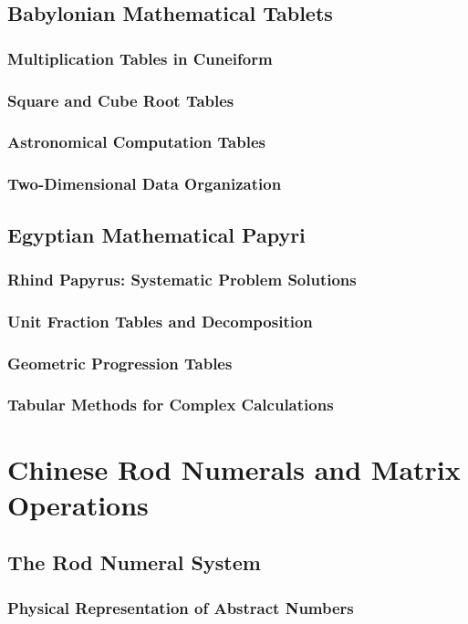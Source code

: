 \documentclass[12pt, oneside, openany]{book}
\begin{document}
\subsection{Babylonian Mathematical Tablets}
\subsubsection{Multiplication Tables in Cuneiform}
\subsubsection{Square and Cube Root Tables}
\subsubsection{Astronomical Computation Tables}
\subsubsection{Two-Dimensional Data Organization}

\subsection{Egyptian Mathematical Papyri}
\subsubsection{Rhind Papyrus: Systematic Problem Solutions}
\subsubsection{Unit Fraction Tables and Decomposition}
\subsubsection{Geometric Progression Tables}
\subsubsection{Tabular Methods for Complex Calculations}

\section{Chinese Rod Numerals and Matrix Operations}
\subsection{The Rod Numeral System}
\subsubsection{Physical Representation of Abstract Numbers}
\end{document}
